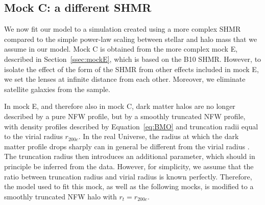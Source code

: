 \documentclass[usenatbib]{mnras}
\def\Sref#1{Section~\ref{#1}\xspace}
\def\Eref#1{Equation~\ref{#1}\xspace}
\begin{document}
\subsection{Mock C: a different SHMR}

We now fit our model to a simulation created using a more complex SHMR compared to the simple power-law scaling between stellar and halo mass that we assume in our model.
Mock C is obtained from the more complex mock E, described in \Sref{ssec:mockE}, which is based on the B10 SHMR. 
However, to isolate the effect of the form of the SHMR from other effects included in mock E, we set the lenses at infinite distance from each other. Moreover, we eliminate satellite galaxies from the sample.

In mock E, and therefore also in mock C, dark matter halos are no longer described by a pure NFW profile, but by a smoothly truncated NFW profile, with density profiles described by \Eref{eq:BMO} and truncation radii equal to the virial radius $r_{200c}$.
In the real Universe, the radius at which the dark matter profile drops sharply can in general be different from the virial radius \citep[see][for a discussion]{D+K14}. The truncation radius then introduces an additional parameter, which should in principle be inferred from the data. However, for simplicity, we assume that the ratio between truncation radius and virial radius is known perfectly.
Therefore, the model used to fit this mock, as well as the following mocks, is modified to a smoothly truncated NFW halo with $r_t = r_{200c}$.
\end{document}
